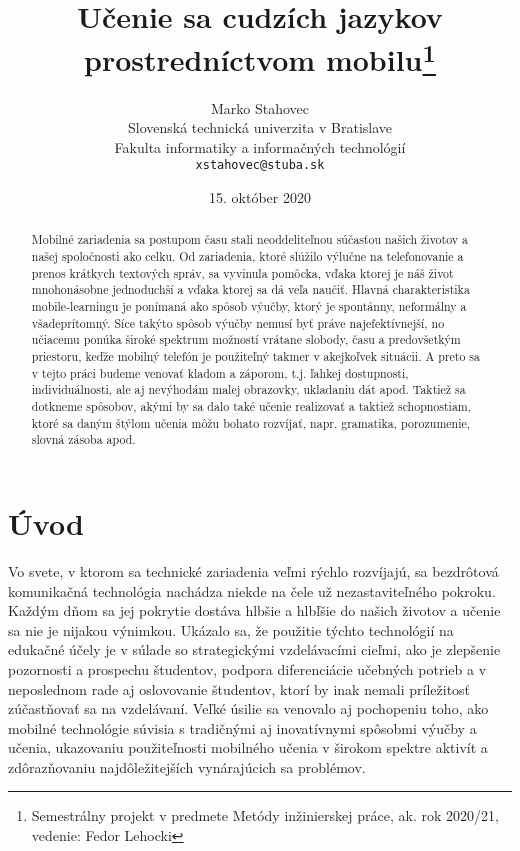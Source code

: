 \documentclass[10pt,twoside,slovak,a4paper]{article}
\title{Učenie sa cudzích jazykov prostredníctvom mobilu\thanks{Semestrálny projekt v predmete Metódy inžinierskej práce, ak. rok 2020/21, vedenie: Fedor Lehocki}} %
\author{Marko Stahovec\\[2pt]
	{\small Slovenská technická univerzita v Bratislave}\\
	{\small Fakulta informatiky a informačných technológií}\\
	{\small \texttt{xstahovec@stuba.sk}}
	}
\date{\small 15. október 2020}
\begin{document}
\maketitle

\begin{abstract}
Mobilné zariadenia sa postupom času stali neoddeliteľnou súčasťou našich životov a našej spoločnosti ako celku. Od zariadenia, ktoré slúžilo výlučne na telefonovanie a prenos krátkych textových správ, sa vyvinula pomôcka, vďaka ktorej je náš život mnohonásobne jednoduchší a vďaka ktorej sa dá veľa naučiť. Hlavná charakteristika mobile-learningu je ponímaná ako spôsob výučby, ktorý je spontánny, neformálny a všadeprítomný. Síce takýto spôsob výučby nemusí byť práve najefektívnejší, no učiacemu ponúka široké spektrum možností vrátane slobody, času a predovšetkým priestoru, keďže mobilný telefón je použiteľný takmer v akejkoľvek situácii. A preto sa v tejto práci budeme venovať kladom a záporom, t.j. ľahkej dostupnosti, individuálnosti, ale aj nevýhodám malej obrazovky, ukladaniu dát apod. Taktiež sa dotkneme spôsobov, akými by sa dalo také učenie realizovať a taktiež schopnostiam, ktoré sa daným štýlom učenia môžu bohato rozvíjať, napr. gramatika, porozumenie, slovná zásoba apod.
\end{abstract}



\section{Úvod}


Vo svete, v ktorom sa technické zariadenia veľmi rýchlo rozvíjajú, sa bezdrôtová komunikačná technológia nachádza niekde na čele už nezastaviteľného pokroku\cite{Miangah2012}. Každým dňom sa jej pokrytie dostáva hlbšie a hlbľšie do našich životov a učenie sa nie je nijakou výnimkou. Ukázalo sa, že použitie týchto technológií na edukačné účely je v súlade so strategickými vzdelávacími cieľmi, ako je zlepšenie pozornosti a prospechu študentov, podpora diferenciácie učebných potrieb a v neposlednom rade aj oslovovanie študentov, ktorí by inak nemali príležitosť zúčastňovať sa na vzdelávaní\cite{KukulskaHulme2009}. Veľké úsilie sa venovalo aj pochopeniu toho, ako mobilné technológie súvisia s tradičnými aj inovatívnymi spôsobmi výučby a učenia, ukazovaniu použiteľnosti mobilného učenia v širokom spektre aktivít a zdôrazňovaniu najdôležitejších vynárajúcich sa problémov\cite{KukulskaHulme2009}. 
\end{document}
